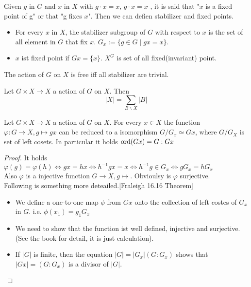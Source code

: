 Given $g$ in $G$ and $x$ in $X$ with $ g\cdot x=x$, $g\cdot x=x$ , it is said that "$x$ is a fixed point of g" or that "g fixes $x$". Then we can defien stabilizer and fixed points.
\begin{definition}
    \begin{itemize}
        \item For every $x$ in \(X\), the stabilizer subgroup of $G$ with respect to $x$ is the set of all element in $G$ that fix $x$. $G_x :=\{g\in G\mid gx = x\}$.
        \item $x$ ist fixed point if $Gx = \{x\}$. $X^G$ is set of all fixed(invariant) point.
    \end{itemize}
\end{definition}
\begin{remark}
    The action of $G$ on $X$ is free iff all stabilizer are trivial.
\end{remark}

\begin{lemma} 
    Let $G\times X \to X$ a action of $G$ on $X$. Then \[|X|=\sum_{B\backslash X} |B|\]
\end{lemma}

\begin{lemma} \label{Bkg}
    Let $G\times X \to X$ a action of $G$ on $X$. For every $x\in X$ the function $\varphi : G \to X, g\mapsto gx $ can be reduced to a isomorphism $G/G_x\simeq Gx$, where $G/G_X$ is set of left cosets. In particular it holds $\operatorname{ord}(Gx) = G : Gx$
\end{lemma}
\begin{proof}
    It holds \(\varphi (g) = \varphi (h) \Leftrightarrow gx = hx \Leftrightarrow h^{-1}gx =x \Leftrightarrow h^{-1} g \in G_x \Leftrightarrow gG_x= hG_x\)\\
    Also $\varphi$ is a injective function $G \to X, g\mapsto $. Obvioulsy is $\varphi $ surjective.\\
    Following is something more deteailed.[Fraleigh 16.16 Theorem]
    \begin{itemize}
        \item We define a one-to-one map \(\phi\) from \(Gx\) onto the collection of left costes of \(G_x\) in \(G\). i.e. \(\phi(x_1)=g_1G_x\)
        \item We need to show that the function ist well defined, injective and surjective.(See the book for detail, it is just calculation).
        \item If \(|G|\) is finite, then the equation \(|G| = |G_x|(G:G_x)\) shows that \(|Gx| = (G:G_x)\) is a divisor of \(|G|\).
    \end{itemize}
\end{proof}

